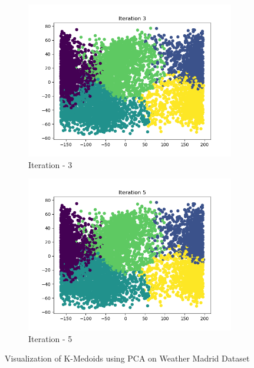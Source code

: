 \documentclass[12pt]{article}
\begin{document}
\begin{figure}[H]
\begin{subfigure}{0.45\linewidth}
		\includegraphics[scale=0.45]{kmd/3.png}
		\caption{Iteration - 3}
	\end{subfigure}%
	\begin{subfigure}{0.45\linewidth}
		\includegraphics[scale=0.45]{kmd/5.png}
		\caption{Iteration - 5}
	\end{subfigure}%
	\caption{Visualization of K-Medoids using PCA on Weather Madrid Dataset}
\end{figure}
\end{document}
